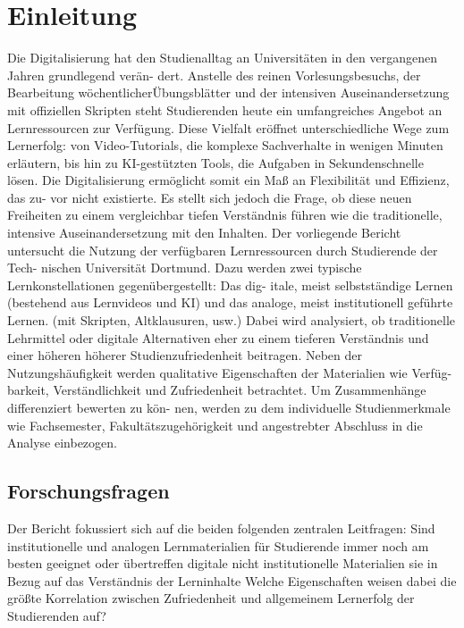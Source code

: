 \documentclass[a4paper, 12pt]{article}
\begin{document}
\section{Einleitung}
Die Digitalisierung hat den Studienalltag an Universitäten in den vergangenen Jahren grundlegend verän- dert. Anstelle des reinen Vorlesungsbesuchs, der Bearbeitung wöchentlicherÜbungsblätter und der intensiven Auseinandersetzung mit offiziellen Skripten steht Studierenden heute ein umfangreiches Angebot an Lernressourcen zur Verfügung. Diese Vielfalt eröffnet unterschiedliche Wege zum Lernerfolg: von Video-Tutorials, die komplexe Sachverhalte in wenigen Minuten erläutern, bis hin zu KI-gestützten Tools, die Aufgaben in Sekundenschnelle lösen. Die Digitalisierung ermöglicht somit ein Maß an Flexibilität und Effizienz, das zu- vor nicht existierte. Es stellt sich jedoch die Frage, ob diese neuen Freiheiten zu einem vergleichbar tiefen Verständnis führen wie die traditionelle, intensive Auseinandersetzung mit den Inhalten. Der vorliegende Bericht untersucht die Nutzung der verfügbaren Lernressourcen durch Studierende der Tech- nischen Universität Dortmund. Dazu werden zwei typische Lernkonstellationen gegenübergestellt: Das dig- itale, meist selbstständige Lernen (bestehend aus Lernvideos und KI) und das analoge, meist institutionell geführte Lernen. (mit Skripten, Altklausuren, usw.) Dabei wird analysiert, ob traditionelle Lehrmittel oder digitale Alternativen eher zu einem tieferen Verständnis und einer höheren höherer Studienzufriedenheit beitragen. Neben der Nutzungshäufigkeit werden qualitative Eigenschaften der Materialien wie Verfüg- barkeit, Verständlichkeit und Zufriedenheit betrachtet. Um Zusammenhänge differenziert bewerten zu kön- nen, werden zu dem individuelle Studienmerkmale wie Fachsemester, Fakultätszugehörigkeit und angestrebter Abschluss in die Analyse einbezogen.

\subsection{Forschungsfragen}
Der Bericht fokussiert sich auf die beiden folgenden zentralen Leitfragen: Sind institutionelle und analogen Lernmaterialien für Studierende immer noch am besten geeignet oder übertreffen digitale nicht institutionelle Materialien sie in Bezug auf das Verständnis der Lerninhalte Welche Eigenschaften weisen dabei die größte Korrelation zwischen Zufriedenheit und allgemeinem Lernerfolg der Studierenden auf?
\end{document}
